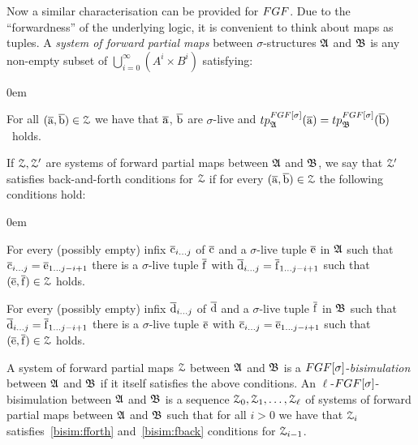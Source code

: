 Now a similar characterisation can be provided for $\FGF$. 
Due to the ``forwardness'' of the underlying logic, it is convenient to think about maps as tuples.
A \emph{system of forward partial maps} between $\sigma$-structures ${\mathfrak{A}}$ and ${\mathfrak{B}}$ is any non-empty subset of $\bigcup_{i=0}^{\infty} (A^i \times B^i)$ satisfying:
\begin{description}\itemsep0em
  \item[\desclabel{(AtomicEq)}{bisim:atomiceq}] For all $(\overline{\mathrm{a}}, \overline{\mathrm{b}}) \in \mathcal{Z}$ we have that $\overline{\mathrm{a}}$, $\overline{\mathrm{b}}$ are $\sigma$-live and $\tp{\FGF[\sigma]}{\str{A}}{\elemtuplea} = \tp{\FGF[\sigma]}{\str{B}}{\elemtupleb}$~holds.
\end{description}
If $\mathcal{Z}, \mathcal{Z}'$ are systems of forward partial maps between ${\mathfrak{A}}$ and ${\mathfrak{B}}$, we say that $\mathcal{Z}'$ satisfies back-and-forth conditions for $\mathcal{Z}$ if for every $(\overline{\mathrm{a}}, \overline{\mathrm{b}}) \in \mathcal{Z}$ the following conditions hold:
\begin{description}\itemsep0em
  \item[\desclabel{(fForth)}{bisim:fforth}] For every (possibly empty) infix $\overline{\mathrm{c}}_{i\ldots j}$ of $\overline{\mathrm{c}}$ and a $\sigma$-live tuple $\overline{\mathrm{e}}$ in ${\mathfrak{A}}$ such that $\overline{\mathrm{c}}_{i\ldots j} = \overline{\mathrm{e}}_{1\ldots j{-}i{+}1}$ there is a $\sigma$-live tuple $\overline{\mathrm{f}}$ with $\overline{\mathrm{d}}_{i\ldots j} = {\overline{\mathrm{f}}}_{1\dots j{-}i{+}1}$ such that $(\overline{\mathrm{e}}, \overline{\mathrm{f}}) \in \mathcal{Z}$ holds.
  \item[\desclabel{(fBack)}{bisim:fback}] For every (possibly empty) infix $\overline{\mathrm{d}}_{i\ldots j}$ of $\overline{\mathrm{d}}$ and a $\sigma$-live tuple $\overline{\mathrm{f}}$ in ${\mathfrak{B}}$ such that $\overline{\mathrm{d}}_{i\ldots j} = {\overline{\mathrm{f}}}_{1\dots j{-}i{+}1}$ there is a $\sigma$-live tuple $\overline{\mathrm{e}}$ with $\overline{\mathrm{c}}_{i\ldots j} = \overline{\mathrm{e}}_{1\ldots j{-}i{+}1}$ such that $(\overline{\mathrm{e}}, \overline{\mathrm{f}}) \in \mathcal{Z}$ holds.
\end{description}
A system of forward partial maps $\mathcal{Z}$ between ${\mathfrak{A}}$ and ${\mathfrak{B}}$ is a $\FGF[\sigma]$-\emph{bisimulation} between ${\mathfrak{A}}$ and ${\mathfrak{B}}$ if it itself satisfies the above conditions.
An $\ell$-$\FGF[\sigma]$-bisimulation between ${\mathfrak{A}}$ and ${\mathfrak{B}}$ is a sequence $\mathcal{Z}_0, \mathcal{Z}_1, \ldots, \mathcal{Z}_\ell$ of systems of forward partial maps between ${\mathfrak{A}}$ and ${\mathfrak{B}}$ such that for all $i > 0$ we have that $\mathcal{Z}_i$ satisfies~\ref{bisim:fforth} and~\ref{bisim:fback} conditions for $\mathcal{Z}_{i{-}1}$.
